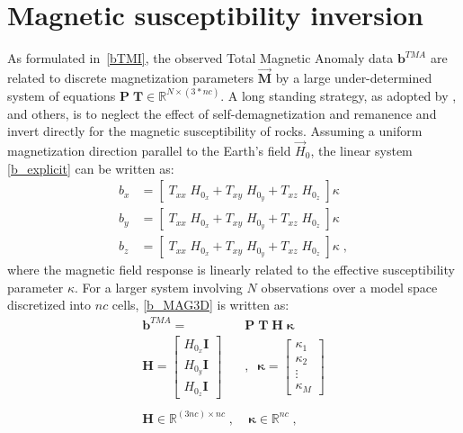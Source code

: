 \newpage
\section{Magnetic susceptibility inversion}\label{ch:Chap3_MSI}
As formulated in~\ref{bTMI}, the observed Total Magnetic Anomaly data $\mathbf{b}^{TMA}$ are related to discrete magnetization parameters $\vec {\mathbf{M}}$ by a large under-determined system of equations $\mathbf{P\;T} \in \mathbb{R}^{N \times (3*nc)}$.
A long standing strategy, as adopted by \cite{LiOldenburg1996}, \cite{Pilkington97} and others, is to neglect the effect of self-demagnetization and remanence and invert directly for the magnetic susceptibility of rocks. 
Assuming a uniform magnetization direction parallel to the Earth's field $\vec H_0$, the linear system \ref{b_explicit} can be written as:
\begin{equation}\label{b_MAG3D}
\begin{split}
	b_{x} &= \left[\;T_{xx}\;H_{0_x} + T_{xy}\;H_{0_y}  + T_{xz}\;H_{0_z}  \;\right] \kappa \\
	b_{y} &= \left[\;T_{xx}\;H_{0_x} + T_{xy}\;H_{0_y}  + T_{xz}\;H_{0_z}  \;\right] \kappa \\
	b_{z} &= \left[\;T_{xx}\;H_{0_x} + T_{xy}\;H_{0_y}  + T_{xz}\;H_{0_z}  \;\right] \kappa \;,
\end{split}
\end{equation}
where the magnetic field response is linearly related to the effective susceptibility parameter $\kappa$.
For a larger system involving $N$ observations over a model space discretized into $nc$ cells, \ref{b_MAG3D} is written as:
\begin{equation} 
	\begin{split}
	\mathbf{b}^{TMA} =& \mathbf{P\;T\;H} \; \boldsymbol{\kappa} \\
	\mathbf{H} = 
	\begin{bmatrix}
	H_{0_x}\mathbf{I} \\
	H_{0_y}\mathbf{I} \\
	H_{0_z}\mathbf{I}
	\end{bmatrix} 
	\;\;&,\;\; \boldsymbol{\kappa} = 
	\begin{bmatrix}
		\kappa_1 \\
		\kappa_2 \\
		\vdots 	 \\
		\kappa_{M} 
	\end{bmatrix} \\ \\
	\mathbf{H} \in \mathbb{R}^{(3nc) \times nc} \;,&\; \boldsymbol{\kappa} \in \mathbb{R}^{nc} \;,
	\end{split}
\end{equation}
